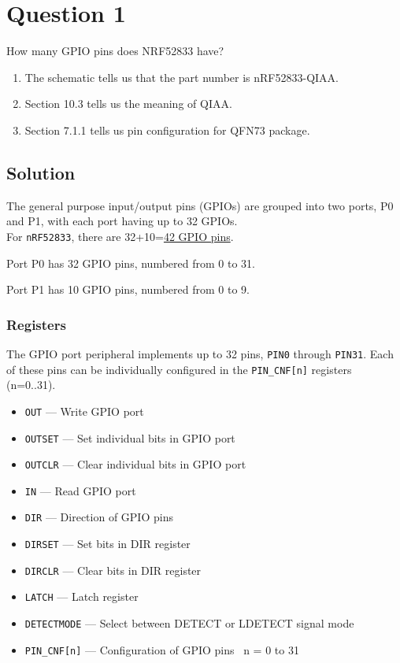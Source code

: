 \section*{Question 1}

How many GPIO pins does NRF52833 have?
\begin{enumerate}[label= (\alph*)]
    \item The schematic tells us that the part number is nRF52833-QIAA.\@
    \item Section 10.3 tells us the meaning of QIAA.\@
    \item Section 7.1.1 tells us pin configuration for QFN73 package.
\end{enumerate}

\subsection*{Solution}

The general purpose input/output pins (GPIOs) are grouped into two ports, P0 and P1, with each port having up to 32 GPIOs.\\
For \texttt{nRF52833}, there are 32+10=\underline{42 GPIO pins}.

Port P0 has 32 GPIO pins, numbered from 0 to 31.

Port P1 has 10 GPIO pins, numbered from 0 to 9.

\subsubsection*{Registers}

The GPIO port peripheral implements up to 32 pins, \texttt{PIN0} through \texttt{PIN31}.
Each of these pins can be individually configured in the \texttt{PIN\_CNF[n]} registers (n=0..31).

\begin{itemize}
    \item \texttt{OUT} --- Write GPIO port
    \item \texttt{OUTSET} --- Set individual bits in GPIO port
    \item \texttt{OUTCLR} --- Clear individual bits in GPIO port
    \item \texttt{IN} --- Read GPIO port
    \item \texttt{DIR} --- Direction of GPIO pins
    \item \texttt{DIRSET} --- Set bits in DIR register
    \item \texttt{DIRCLR} --- Clear bits in DIR register
    \item \texttt{LATCH} --- Latch register
    \item \texttt{DETECTMODE} --- Select between DETECT or LDETECT signal mode
    \item \texttt{PIN\_CNF[n]} --- Configuration of GPIO pins
          \subitem~n = 0 to 31
\end{itemize}

